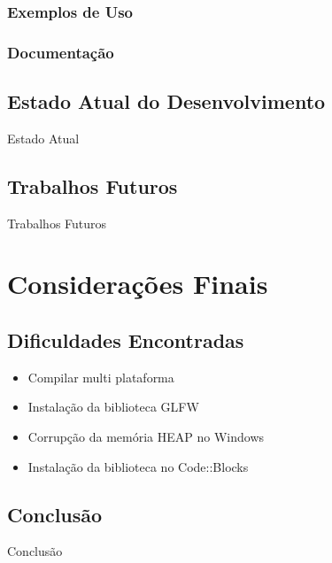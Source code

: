 \documentclass[12pt, %
openright,
oneside, %
a4paper,    %
brazil]{facom-ufu-abntex2}
\begin{document}
\subsection{Exemplos de Uso}

\subsection{Documentação}

\section{Estado Atual do Desenvolvimento}
Estado Atual

\section{Trabalhos Futuros}
Trabalhos Futuros

\chapter{Considerações Finais}

\section{Dificuldades Encontradas}

\begin{itemize}
  
  \item Compilar multi plataforma
  \item Instalação da biblioteca GLFW
  \item Corrupção da memória HEAP no Windows
  \item Instalação da biblioteca no Code::Blocks
  
\end{itemize}

\section{Conclusão}
Conclusão


\iffalse
\chapter*[Conclusão]{Conclusão}
\addcontentsline{toc}{chapter}{Conclusão}
Descrever aqui as conclusões e/ou considerações finais.
Destacar as contribuições originais do trabalho.
Propor trabalhos futuros em continuidade ao trabalho realizado.
\fi
\end{document}
